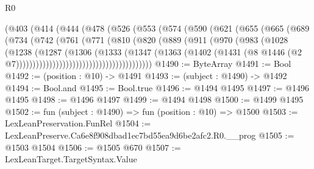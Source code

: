 \begin{lexlean}{R0}
\begin{coremodule}
                    (@403
                      (@414
                        (@444
                          (@478
                            (@526
                              (@553
                                (@574
                                  (@590
                                    (@621
                                      (@655
                                        (@665
                                          (@689
                                            (@734
                                              (@742
                                                (@761
                                                  (@771
                                                    (@810
                                                      (@820
                                                        (@889
                                                          (@911
                                                            (@970
                                                              (@983
                                                                (@1028
                                                                  (@1238
                                                                    (@1287
                                                                      (@1306
                                                                        (@1333
                                                                          (@1347
                                                                            (@1363
                                                                              (@1402
                                                                                (@1431
                                                                                  (@8
                                                                                    @1446
                                                                                    (@2
                                                                                      @7)))))))))))))))))))))))))))))))))))))))))
@1490 := ByteArray
@1491 := Bool
@1492 := (position : @10) -> @1491
@1493 := (subject : @1490) -> @1492
@1494 := Bool.and
@1495 := Bool.true
@1496 := @1494 @1495
@1497 := @1496 @1495
@1498 := @1496 @1497
@1499 := @1494 @1498
@1500 := @1499 @1495
@1502 := fun (subject : @1490) => fun (position : @10) => @1500
@1503 := LexLeanPreservation.FunRel
@1504 := LexLeanPreserve.Ca6e8f908dbad1ec7bd55ea9d6be2afc2.R0.__prog
@1505 := @1503 @1504
@1506 := @1505 @670
@1507 := LexLeanTarget.TargetSyntax.Value

\end{coremodule}
\end{lexlean}
